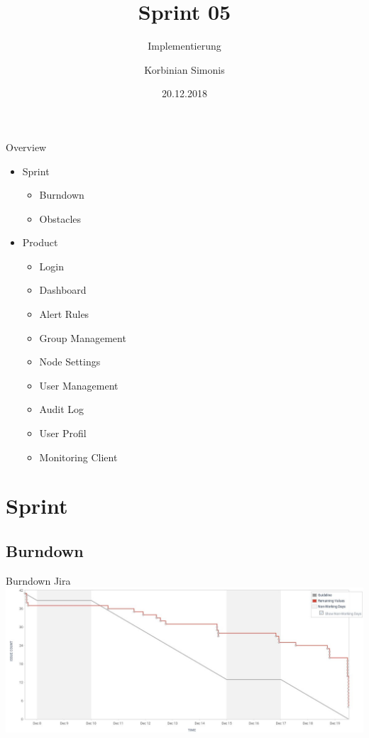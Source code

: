\documentclass[aspectratio=1610,20pt,utf8]{beamer}
\title[Team Hams]{Sprint 05}
\subtitle{Implementierung}
\author[\today]{Korbinian Simonis}
\institute[Team Hams]
{
  Team Hams\\
  Leading Product Owner and Scrum Master\\
}
\date{20.12.2018}
\begin{document}
\begin{frame}[plain]
  \titlepage
\end{frame}

\begin{frame}{Overview}
\begin{itemize} \small
	\item Sprint
	\begin{itemize} \tiny
		\item Burndown
		\item Obstacles
	\end{itemize}
	\item Product
	\begin{itemize} \tiny
		\item Login
		\item Dashboard
		\item Alert Rules
		\item Group Management
		\item Node Settings
		\item User Management
		\item Audit Log
		\item User Profil
		\item Monitoring Client
	\end{itemize}
\end{itemize}	
\end{frame}

\section{Sprint} 

\subsection{Burndown}
\begin{frame}{Burndown Jira}
	\centering
	\includegraphics[width=15cm]{img/s05_hams_jira_burndown.jpg}
\end{frame}
\end{document}
